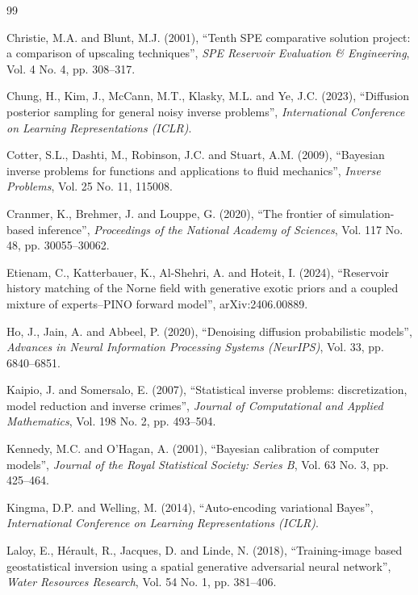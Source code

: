 \documentclass[12pt]{article}
\begin{document}
\begin{thebibliography}{99}

 Christie, M.A. and Blunt, M.J. (2001), ``Tenth SPE comparative solution project: a comparison of upscaling techniques'', \emph{SPE Reservoir Evaluation \& Engineering}, Vol. 4 No. 4, pp. 308--317.

 Chung, H., Kim, J., McCann, M.T., Klasky, M.L. and Ye, J.C. (2023), ``Diffusion posterior sampling for general noisy inverse problems'', \emph{International Conference on Learning Representations (ICLR)}.

 Cotter, S.L., Dashti, M., Robinson, J.C. and Stuart, A.M. (2009), ``Bayesian inverse problems for functions and applications to fluid mechanics'', \emph{Inverse Problems}, Vol. 25 No. 11, 115008.

 Cranmer, K., Brehmer, J. and Louppe, G. (2020), ``The frontier of simulation-based inference'', \emph{Proceedings of the National Academy of Sciences}, Vol. 117 No. 48, pp. 30055--30062.

 Etienam, C., Katterbauer, K., Al-Shehri, A. and Hoteit, I. (2024), ``Reservoir history matching of the Norne field with generative exotic priors and a coupled mixture of experts--PINO forward model'', arXiv:2406.00889.

 Ho, J., Jain, A. and Abbeel, P. (2020), ``Denoising diffusion probabilistic models'', \emph{Advances in Neural Information Processing Systems (NeurIPS)}, Vol. 33, pp. 6840--6851.

 Kaipio, J. and Somersalo, E. (2007), ``Statistical inverse problems: discretization, model reduction and inverse crimes'', \emph{Journal of Computational and Applied Mathematics}, Vol. 198 No. 2, pp. 493--504.

 Kennedy, M.C. and O'Hagan, A. (2001), ``Bayesian calibration of computer models'', \emph{Journal of the Royal Statistical Society: Series B}, Vol. 63 No. 3, pp. 425--464.

 Kingma, D.P. and Welling, M. (2014), ``Auto-encoding variational Bayes'', \emph{International Conference on Learning Representations (ICLR)}.

 Laloy, E., H\'erault, R., Jacques, D. and Linde, N. (2018), ``Training-image based geostatistical inversion using a spatial generative adversarial neural network'', \emph{Water Resources Research}, Vol. 54 No. 1, pp. 381--406.


\end{thebibliography}
\end{document}
